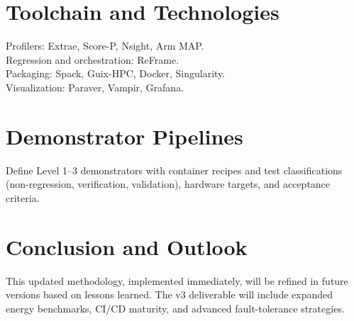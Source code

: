 \section{Toolchain and Technologies}
Profilers: Extrae, Score-P, Nsight, Arm MAP. \\
Regression and orchestration: ReFrame. \\
Packaging: Spack, Guix-HPC, Docker, Singularity. \\
Visualization: Paraver, Vampir, Grafana.

\section{Demonstrator Pipelines}
Define Level 1–3 demonstrators with container recipes and test classifications (non-regression, verification, validation), hardware targets, and acceptance criteria.

\section{Conclusion and Outlook}
This updated methodology, implemented immediately, will be refined in future versions based on lessons learned. The v3 deliverable will include expanded energy benchmarks, CI/CD maturity, and advanced fault-tolerance strategies.
